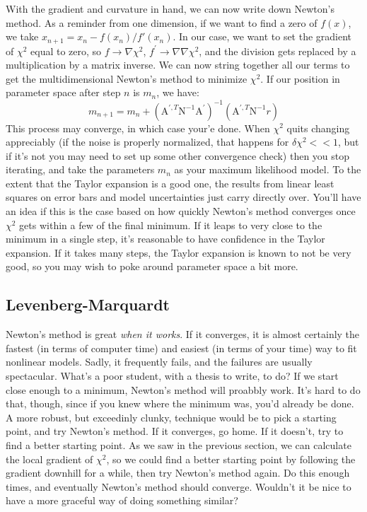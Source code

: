 \documentclass[letterpaper,11pt,preprint]{aastex}
\begin{document}
{With the gradient and curvature in hand, we can now write down
Newton's method.  As a reminder from one dimension, if we want to find
a zero of $f(x)$, we take $x_{n+1} = x_{n}-f(x_{n})/f'(x_{n})$.  In
our case, we want to set the gradient of $\chi^2$ equal to zero, so $f
\rightarrow \nabla \chi^2$, $f^{'} \rightarrow \nabla \nabla \chi^2$,
and the division gets replaced by a multiplication by a matrix
inverse.  We can now string together all our terms to get the
multidimensional Newton's method to minimize $\chi^2$.  If our
position in parameter space after step $n$ is $m_n$, we have:
$$m_{n+1}=m_n+\left ( \mathrm{A}^{',T} \mathrm{N}^{-1} \mathrm{A}^{'}
\right )^{-1} \left (\mathrm{A}^{',T} \mathrm{N}^{-1} r\right )$$
This process may converge, in which case your'e done.  When $\chi^2$
quits changing appreciably (if the noise is properly normalized, that
happens for $\delta \chi^2 <<1$, but if it's not you may need to set
up some other convergence check) then you stop iterating, and take the
parameters $m_n$ as your maximum likelihood model.  To the extent that
the Taylor expansion is a good one, the results from linear least
squares on error bars and model uncertainties just carry directly
over.   You'll have an idea if this is the case based on how quickly
Newton's method converges once $\chi^2$ gets within a few of the final
minimum.  If it leaps to very close to the minimum in a single step,
it's reasonable to have confidence in the Taylor expansion.  If it
takes many steps, the Taylor expansion is known to not be very good,
so you may wish to poke around parameter space a bit more.  

\subsection{Levenberg-Marquardt}
Newton's method is great \textit{when it works}.  If it converges, it
is almost certainly the fastest (in terms of computer time) and
easiest (in terms of your time) way to fit nonlinear models.  Sadly,
it frequently fails, and the failures are usually spectacular.  What's
a poor student, with a thesis to write, to do?  If we start close
enough to a minimum, Newton's method will proabbly work.  It's hard to
do that, though, since if you knew where the minimum was, you'd
already be done.  A more robust, but exceedinly clunky, technique
would be to pick a starting point, and try Newton's method.  If it
converges, go home.  If it doesn't, try to find a better starting
point.  As we saw in the previous section, we can calculate the local
gradient of $\chi^2$, so we could find a better starting point by
following the gradient downhill for a while, then try Newton's method
again.  Do this enough times, and eventually Newton's method should
converge.  Wouldn't it be nice to have a more graceful way of doing
something similar?

}
\end{document}
